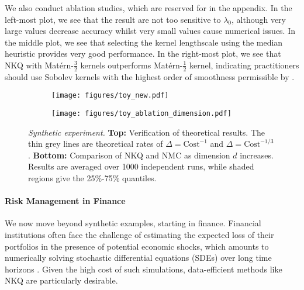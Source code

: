 We also conduct ablation studies, which are reserved for  in the appendix. 
In the left-most plot, we see that the result are not too sensitive to $\lambda_0$, although very large values decrease accuracy whilst very small values cause numerical issues.
In the middle plot, we see that selecting the kernel lengthscale using the median heuristic provides very good performance.
In the right-most plot, we see that NKQ with Mat\'{e}rn-$\frac{3}{2}$ kernels outperforms Mat\'{e}rn-$\frac{1}{2}$ kernel, indicating practitioners should use Sobolev kernels with the highest order of smoothness permissible by . 

\begin{figure}[t]
\centering
\begin{subfigure}{0.46\linewidth}
    \centering
    \texttt{[image: figures/toy\_new.pdf]}
\end{subfigure}
\vspace{-9pt}
\begin{subfigure}{0.46\linewidth}
    \centering
    \texttt{[image: figures/toy\_ablation\_dimension.pdf]}
\end{subfigure}
\caption{\emph{Synthetic experiment.}
\textbf{Top:} Verification of theoretical results. The thin grey lines are theoretical rates of 
$\Delta = \text{Cost}^{-1}$ and $\Delta = \text{Cost}^{-1/3}$.
\textbf{Bottom:} Comparison of NKQ and NMC as dimension $d$ increases.
Results are averaged over 1000 independent runs, while shaded regions 
give the 25\%-75\% quantiles.}
\label{fig:toy_experiment}
\end{figure}

\paragraph{Risk Management in Finance} We now move beyond synthetic examples, starting in finance.
Financial institutions often face the challenge of estimating the expected loss of their portfolios in the presence of potential economic shocks, which amounts to numerically solving stochastic differential equations (SDEs) over long time horizons \cite{achdou2005computational}. 
Given the high cost of such simulations, data-efficient methods like NKQ are particularly desirable.

